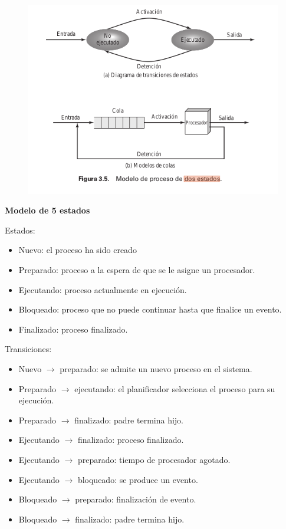 \documentclass{article}
\begin{document}
\begin{figure}[h]
\centering
\includegraphics[scale=1,width=\textwidth]{dos_estados.png}
\end{figure}

\textbf{Modelo de 5 estados}

Estados:
\begin{itemize}
\item Nuevo: el proceso ha sido creado

\item Preparado: proceso a la espera de que se le asigne un procesador.

\item Ejecutando: proceso actualmente en ejecución.

\item Bloqueado: proceso que no puede continuar hasta que finalice un evento.

\item Finalizado: proceso finalizado.
\end{itemize}

Transiciones:
\begin{itemize}
\item Nuevo $\rightarrow$ preparado: se admite un nuevo proceso en el sistema.

\item Preparado $\rightarrow$ ejecutando: el planificador selecciona el proceso para su ejecución.

\item Preparado $\rightarrow$ finalizado: padre termina hijo.

\item Ejecutando $\rightarrow$ finalizado: proceso finalizado.

\item Ejecutando $\rightarrow$ preparado: tiempo de procesador agotado.

\item Ejecutando $\rightarrow$ bloqueado: se produce un evento.

\item Bloqueado $\rightarrow$ preparado: finalización de evento.

\item Bloqueado $\rightarrow$ finalizado: padre termina hijo.
\end{itemize}
\end{document}
